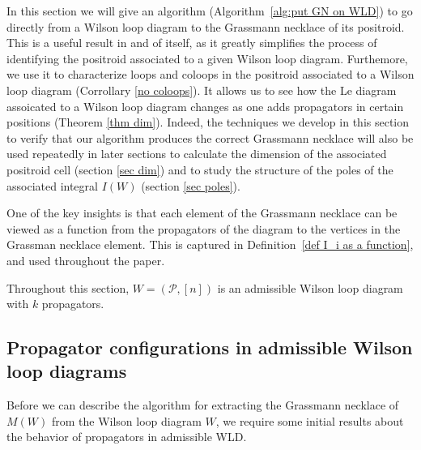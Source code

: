 \documentclass[11pt]{article}
\newcommand{\note}{\todo[color=green!40]}
\newcommand{\cP}{\mathcal{P}}
\theoremstyle{remark}
\theoremstyle{definition}
\begin{document}
In this section we will give an algorithm (Algorithm~\ref{alg:put GN on WLD}) to go directly from a Wilson loop diagram to the Grassmann necklace of its positroid. This is a useful result in and of itself, as it greatly simplifies the process of identifying the positroid associated to a given Wilson loop diagram. Furthemore, we use it to characterize loops and coloops in the positroid associated to a Wilson loop diagram (Corrollary \ref{no coloops}). It allows us to see how the Le diagram assoicated to a Wilson loop diagram changes as one adds propagators in certain positions (Theorem \ref{thm dim}). Indeed, the techniques we develop in this section to verify that our algorithm produces the correct Grassmann necklace will also be used repeatedly in later sections to calculate the dimension of the associated positroid cell (section \ref{sec dim}) and to study the structure of the poles of the associated integral $I(W)$ (section \ref{sec poles}).

One of the key insights is that each element of the Grassmann necklace can be viewed as a function from the propagators of the diagram to the vertices in the Grassman necklace element.  This is captured in Definition~\ref{def I_i as a function}, and used throughout the paper.



Throughout this section, $W = (\cP,[n])$ is an admissible Wilson loop diagram with $k$ propagators.





\subsection{Propagator configurations in admissible Wilson loop diagrams}\label{sec:propagator configs}

Before we can describe the algorithm for extracting the Grassmann necklace of $M(W)$ from the Wilson loop diagram $W$, we require some initial results about the behavior of propagators in admissible WLD.
\end{document}
